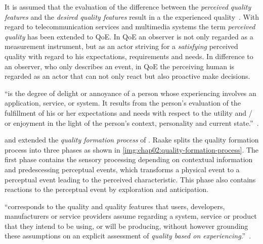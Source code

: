 It is assumed that the evaluation of the difference between the \emph{perceived quality features} and the \emph{desired quality features} result in a the experienced quality~\citet[p. 23]{raake_book}.
With regard to telecommunication services and multimedia systems the term \emph{perceived quality} has been extended to \acf{QoE}.
In \ac{QoE} an observer is not only regarded as a measurement instrument, but as an actor striving for a \emph{satisfying} perceived quality with regard to his expectations, requirements and needs.
In difference to an observer, who only describes an event, in \ac{QoE} the perceiving human is regarded as an actor that can not only react but also proactive make decisions.

\begin{definition}
``is the degree of delight or annoyance of a person whose experiencing involves an application, service, or system.
It results from the person’s evaluation of the fulfillment of his or her expectations and needs with respect to the utility and / or enjoyment in the light of the person’s context, personality and current state.''~\citep[p. 21]{moller_quality_2014}.
\end{definition}

\citet{raake_speech_2006} and \citet{moller_quality_2014} extended the \emph{quality formation process} of \citet{jekosch_voice_2005}.
Raake splits the quality formation process into three phases as shown in \autoref{img:chap02:quality-formation-process}.
The first phase contains the sensory processing depending on contextual information and predescessing perceptual events, which transforms a physical event to a perceptual event leading to the perceived characteristic.
This phase also contains reactions to the perceptual event by exploration and anticipation.


\begin{definition}\label{def:assumedquality}
``corresponds to the quality and quality features that users, developers, manufacturers or service providers assume regarding a system, service or product that they intend to be using, or will be producing, without however grounding these assumptions on an explicit assessment of \textit{quality based on experiencing}.''~\citep[p. 20]{moller_quality_2014}.
\end{definition}


